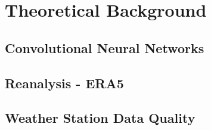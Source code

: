 \section{Theoretical Background}
\label{sec:theory}

\subsection{Convolutional Neural Networks}

\subsection{Reanalysis - ERA5}

\subsection{Weather Station Data Quality}